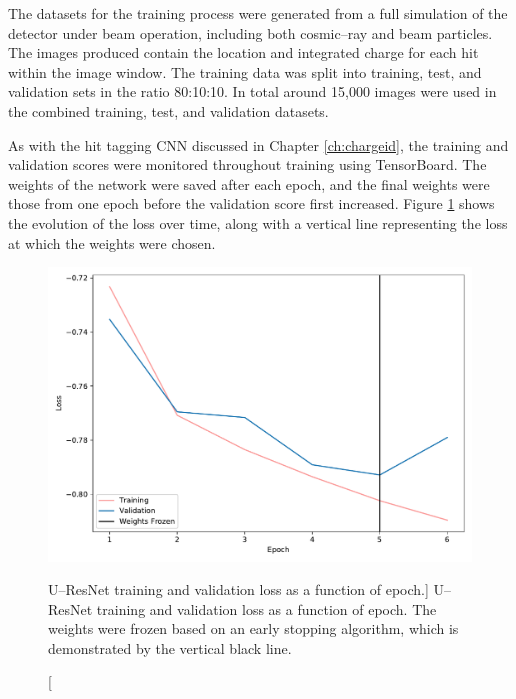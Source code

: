 The datasets for the training process were generated from a full simulation of
the \protodune{} detector under beam operation, including both cosmic--ray and
beam particles. The images produced contain the location and integrated charge
for each hit within the image window. The training data was split into training, 
test, and validation sets in the ratio 80:10:10. In total around 15,000 images 
were used in the combined training, test, and validation datasets.

As with the hit tagging CNN discussed in Chapter \ref{ch:chargeid}, the 
training and validation scores were monitored throughout training using 
TensorBoard. The weights of the network were saved after each epoch, and the 
final weights were those from one epoch before the validation score first 
increased. Figure \ref{fig:unet_loss} shows the evolution of the loss over 
time, along with a vertical line representing the loss at which the weights 
were chosen.
\begin{figure}
	\centering
	\includegraphics[width=\textwidth]{figures/unet_loss.pdf}
	\caption
	[U--ResNet training and validation loss as a function of epoch.]
	{U--ResNet training and validation loss as a function of epoch. The weights were
	frozen based on an early stopping algorithm, which is demonstrated by the
	vertical black line.}
	\label{fig:unet_loss}
\end{figure}

